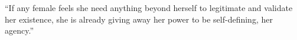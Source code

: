 \documentclass[a4paper, 11pt]{article} %
\begin{document}
``If any female feels she need anything beyond herself to legitimate and validate her existence, she is already giving away her power to be self-defining, her agency.'' \cite{hooksforeveryone}





{}


\end{document}

